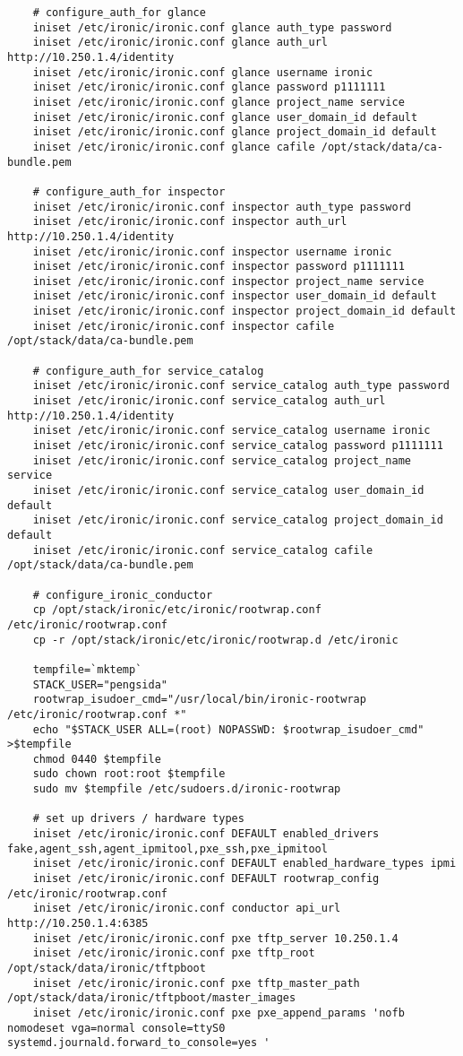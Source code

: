 \documentclass[a4paper,left=1.5cm,right=1.5cm,11pt]{article}
\begin{document}
\begin{lstlisting}
    # configure_auth_for glance
	iniset /etc/ironic/ironic.conf glance auth_type password
    iniset /etc/ironic/ironic.conf glance auth_url http://10.250.1.4/identity
    iniset /etc/ironic/ironic.conf glance username ironic
    iniset /etc/ironic/ironic.conf glance password p1111111
    iniset /etc/ironic/ironic.conf glance project_name service
    iniset /etc/ironic/ironic.conf glance user_domain_id default
    iniset /etc/ironic/ironic.conf glance project_domain_id default
    iniset /etc/ironic/ironic.conf glance cafile /opt/stack/data/ca-bundle.pem

	# configure_auth_for inspector
	iniset /etc/ironic/ironic.conf inspector auth_type password
    iniset /etc/ironic/ironic.conf inspector auth_url http://10.250.1.4/identity
    iniset /etc/ironic/ironic.conf inspector username ironic
    iniset /etc/ironic/ironic.conf inspector password p1111111
    iniset /etc/ironic/ironic.conf inspector project_name service
    iniset /etc/ironic/ironic.conf inspector user_domain_id default
    iniset /etc/ironic/ironic.conf inspector project_domain_id default
    iniset /etc/ironic/ironic.conf inspector cafile /opt/stack/data/ca-bundle.pem

	# configure_auth_for service_catalog
	iniset /etc/ironic/ironic.conf service_catalog auth_type password
    iniset /etc/ironic/ironic.conf service_catalog auth_url http://10.250.1.4/identity
    iniset /etc/ironic/ironic.conf service_catalog username ironic
    iniset /etc/ironic/ironic.conf service_catalog password p1111111
    iniset /etc/ironic/ironic.conf service_catalog project_name service
    iniset /etc/ironic/ironic.conf service_catalog user_domain_id default
    iniset /etc/ironic/ironic.conf service_catalog project_domain_id default
    iniset /etc/ironic/ironic.conf service_catalog cafile /opt/stack/data/ca-bundle.pem

	# configure_ironic_conductor
    cp /opt/stack/ironic/etc/ironic/rootwrap.conf /etc/ironic/rootwrap.conf
    cp -r /opt/stack/ironic/etc/ironic/rootwrap.d /etc/ironic

	tempfile=`mktemp`
	STACK_USER="pengsida"
	rootwrap_isudoer_cmd="/usr/local/bin/ironic-rootwrap /etc/ironic/rootwrap.conf *"
	echo "$STACK_USER ALL=(root) NOPASSWD: $rootwrap_isudoer_cmd" >$tempfile
    chmod 0440 $tempfile
    sudo chown root:root $tempfile
    sudo mv $tempfile /etc/sudoers.d/ironic-rootwrap

	# set up drivers / hardware types
    iniset /etc/ironic/ironic.conf DEFAULT enabled_drivers fake,agent_ssh,agent_ipmitool,pxe_ssh,pxe_ipmitool
    iniset /etc/ironic/ironic.conf DEFAULT enabled_hardware_types ipmi
    iniset /etc/ironic/ironic.conf DEFAULT rootwrap_config /etc/ironic/rootwrap.conf
    iniset /etc/ironic/ironic.conf conductor api_url http://10.250.1.4:6385
	iniset /etc/ironic/ironic.conf pxe tftp_server 10.250.1.4
    iniset /etc/ironic/ironic.conf pxe tftp_root /opt/stack/data/ironic/tftpboot
    iniset /etc/ironic/ironic.conf pxe tftp_master_path /opt/stack/data/ironic/tftpboot/master_images
	iniset /etc/ironic/ironic.conf pxe pxe_append_params 'nofb nomodeset vga=normal console=ttyS0 systemd.journald.forward_to_console=yes '


\end{lstlisting}
\end{document}
